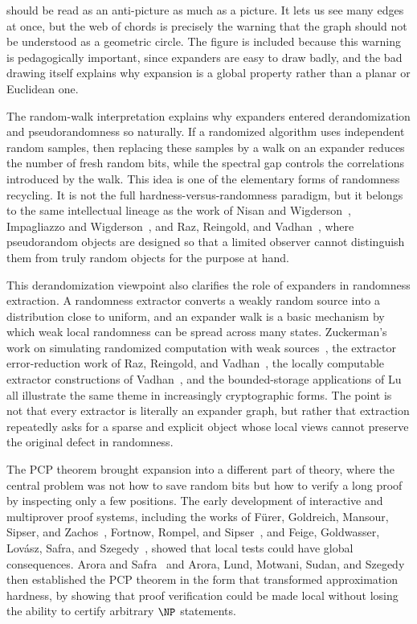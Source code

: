  should be read as an anti-picture as much as a picture. It lets us see many edges at once, but the web of chords is precisely the warning that the graph should not be understood as a geometric circle. The figure is included because this warning is pedagogically important, since expanders are easy to draw badly, and the bad drawing itself explains why expansion is a global property rather than a planar or Euclidean one.

 The random-walk interpretation explains why expanders entered derandomization and pseudorandomness so naturally. If a randomized algorithm uses independent random samples, then replacing these samples by a walk on an expander reduces the number of fresh random bits, while the spectral gap controls the correlations introduced by the walk. This idea is one of the elementary forms of randomness recycling. It is not the full hardness-versus-randomness paradigm, but it belongs to the same intellectual lineage as the work of Nisan and Wigderson~\cite{FOCS:NisWig88}, Impagliazzo and Wigderson~\cite{IW1997}, and Raz, Reingold, and Vadhan~\cite{FOCS:RazReiVad99}, where pseudorandom objects are designed so that a limited observer cannot distinguish them from truly random objects for the purpose at hand.

This derandomization viewpoint also clarifies the role of expanders in randomness extraction. A randomness extractor converts a weakly random source into a distribution close to uniform, and an expander walk is a basic mechanism by which weak local randomness can be spread across many states. Zuckerman's work on simulating randomized computation with weak sources~\cite{FOCS:Zuckerman90,FOCS:Zuckerman91}, the extractor error-reduction work of Raz, Reingold, and Vadhan~\cite{FOCS:RazReiVad99}, the locally computable extractor constructions of Vadhan~\cite{C:Vadhan03,JC:Vadhan04}, and the bounded-storage applications of Lu~\cite{JC:Lu04} all illustrate the same theme in increasingly cryptographic forms. The point is not that every extractor is literally an expander graph, but rather that extraction repeatedly asks for a sparse and explicit object whose local views cannot preserve the original defect in randomness.

 The PCP theorem brought expansion into a different part of theory, where the central problem was not how to save random bits but how to verify a long proof by inspecting only a few positions. The early development of interactive and multiprover proof systems, including the works of F{\"u}rer, Goldreich, Mansour, Sipser, and Zachos~\cite{FGM+1989}, Fortnow, Rompel, and Sipser~\cite{FRS1994}, and Feige, Goldwasser, Lov{\'a}sz, Safra, and Szegedy~\cite{FGL+1996}, showed that local tests could have global consequences. Arora and Safra~\cite{AS1998} and Arora, Lund, Motwani, Sudan, and Szegedy~\cite{ALM+1998} then established the PCP theorem in the form that transformed approximation hardness, by showing that proof verification could be made local without losing the ability to certify arbitrary \(\NP\) statements.


